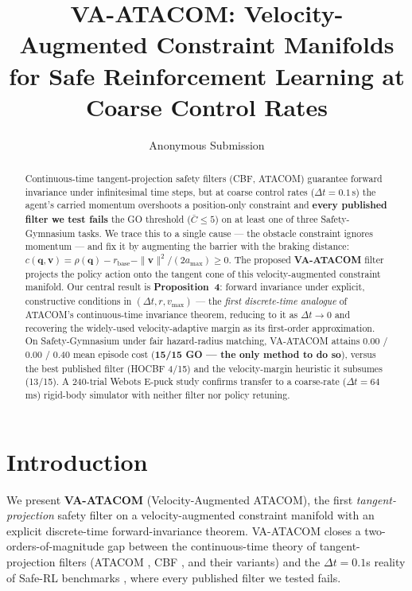 \documentclass[letterpaper]{article}
\title{VA-ATACOM: Velocity-Augmented Constraint Manifolds\\for Safe Reinforcement Learning at Coarse Control Rates}
\author{
    Anonymous Submission
}
\begin{document}
\maketitle

\begin{abstract}
Continuous-time tangent-projection safety filters (CBF, ATACOM) guarantee forward invariance under infinitesimal time steps, but at coarse control rates ($\Delta t{=}0.1$\,s) the agent's carried momentum overshoots a position-only constraint and \textbf{every published filter we test fails} the GO threshold ($\bar C\!\le\!5$) on at least one of three Safety-Gymnasium tasks. We trace this to a single cause --- the obstacle constraint ignores momentum --- and fix it by augmenting the barrier with the braking distance: $c(\boldsymbol q,\boldsymbol v){=}\rho(\boldsymbol q){-}r_\text{base}{-}\|\boldsymbol v\|^2{/}(2a_{\max}){\ge}0$. The proposed \textbf{VA-ATACOM} filter projects the policy action onto the tangent cone of this velocity-augmented constraint manifold. Our central result is \textbf{Proposition~4}: forward invariance under explicit, constructive conditions in $(\Delta t, r, v_{\max})$ --- the \emph{first discrete-time analogue} of ATACOM's continuous-time invariance theorem, reducing to it as $\Delta t\to0$ and recovering the widely-used velocity-adaptive margin as its first-order approximation. On Safety-Gymnasium under fair hazard-radius matching, VA-ATACOM attains 0.00 / 0.00 / 0.40 mean episode cost (\textbf{15/15 GO --- the only method to do so}), versus the best published filter (HOCBF 4/15) and the velocity-margin heuristic it subsumes (13/15). A 240-trial Webots E-puck study confirms transfer to a coarse-rate ($\Delta t{=}64$\,ms) rigid-body simulator with neither filter nor policy retuning.
\end{abstract}

\section{Introduction}

We present \textbf{VA-ATACOM} (Velocity-Augmented ATACOM), the first \emph{tangent-projection} safety filter on a velocity-augmented constraint manifold with an explicit discrete-time forward-invariance theorem. VA-ATACOM closes a two-orders-of-magnitude gap between the continuous-time theory of tangent-projection filters (ATACOM \cite{liu2022,liu2024,liu2025}, CBF \cite{ames2014,ames2017}, and their variants) and the $\Delta t = 0.1$s reality of Safe-RL benchmarks \cite{ji2023}, where every published filter we tested fails.
\end{document}
